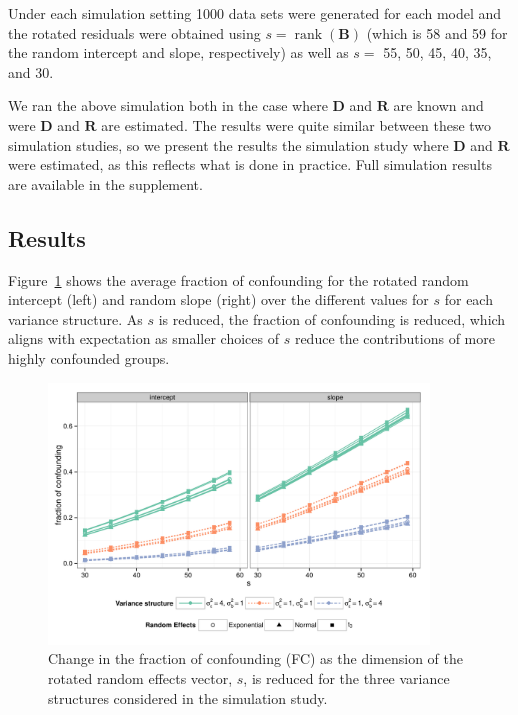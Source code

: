 \documentclass[12pt]{article} %
\newcommand{\al}[1]{{\color{red} #1}}
\DeclareMathOperator{\rank}{rank}
\begin{document}
Under each simulation setting 1000 data sets were generated for each model and the rotated residuals were obtained using $s = \rank(\bm{B})$ (which is 58 and 59 for the random intercept and slope, respectively) as well as $s =$ 55, 50, 45, 40, 35, and 30. 

\al{We ran the above simulation both in the case where $\bm{D}$ and $\bm{R}$ are known and were $\bm{D}$ and $\bm{R}$ are estimated. The results were quite similar between these two simulation studies, so we present the results the simulation study where  $\bm{D}$ and $\bm{R}$ were estimated, as this reflects what is done in practice. Full simulation results are available in the supplement.}


\subsection{Results}\label{sec:sim-results}

Figure~\ref{fig:fc} shows the average fraction of confounding for the rotated random intercept (left) and random slope (right) over the different values for $s$ for each variance structure. As $s$ is reduced, the fraction of confounding is reduced, which aligns with expectation as smaller choices of $s$ reduce the contributions of more highly confounded groups.

\begin{figure}[h]
	\centering
	\includegraphics[width=0.9\textwidth]{fc_by_s.pdf}
	\caption{\label{fig:fc} Change in the fraction of confounding (FC) as the dimension of the rotated random effects vector, $s$, is reduced for the three variance structures considered in the simulation study. %
	}
\end{figure}
\end{document}
